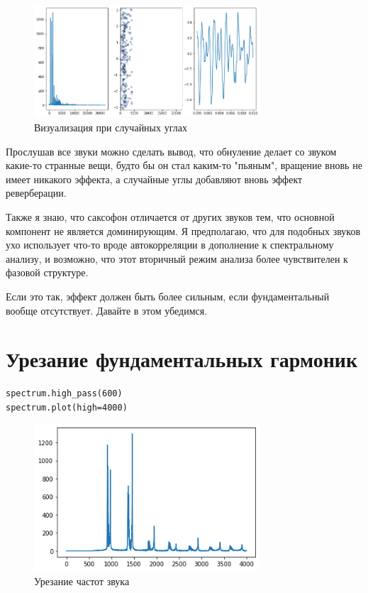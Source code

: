 \documentclass[a4paper,12pt]{report}
\begin{document}
\begin{figure}[H]
        \centering
        \includegraphics[width=0.75\textwidth]{lab6_fig3_16.png}
        \caption{Визуализация при случайных углах}
        \label{fig:lab6_fig3_16}
\end{figure}

Прослушав все звуки можно сделать вывод, что обнуление делает со звуком какие-то странные вещи, будто бы он стал каким-то "пьяным", вращение вновь не имеет никакого эффекта, а случайные углы добавляют вновь эффект реверберации.

Также я знаю, что саксофон отличается от других звуков тем, что основной компонент не является доминирующим. Я предполагаю, что для подобных звуков ухо использует что-то вроде автокорреляции в дополнение к спектральному анализу, и возможно, что этот вторичный режим анализа более чувствителен к фазовой структуре.

Если это так, эффект должен быть более сильным, если фундаментальный вообще отсутствует. Давайте в этом убедимся.

\section{Урезание фундаментальных гармоник}

\begin{lstlisting}[caption=Урезание частот звука]
spectrum.high_pass(600)
spectrum.plot(high=4000)
\end{lstlisting}

\begin{figure}[H]
        \centering
        \includegraphics[width=0.75\textwidth]{lab6_fig3_17.png}
        \caption{Урезание частот звука}
        \label{fig:lab6_fig3_17}
\end{figure}
\end{document}
